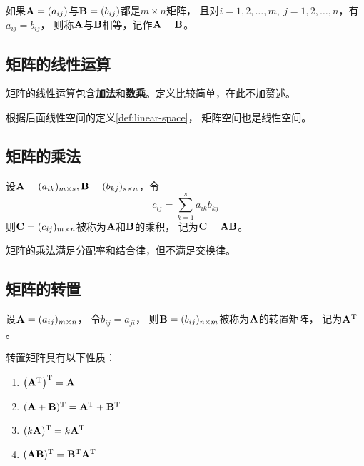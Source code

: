 \begin{definition}[矩阵相等]
  如果$\mathbf{A}=(a_{ij})$与$\mathbf{B}=(b_{ij})$都是$m\times n$矩阵，
  且对$i=1,2,\dots,m,\ j=1,2,\dots,n$，有$a_{ij}=b_{ij}$，
  则称$\mathbf{A}$与$\mathbf{B}$相等，记作$\mathbf{A}=\mathbf{B}$。
\end{definition}

\subsection{矩阵的线性运算}
矩阵的线性运算包含\textbf{加法}和\textbf{数乘}。定义比较简单，在此不加赘述。

根据后面线性空间的定义\ref{def:linear-space}，
矩阵空间也是线性空间。

\subsection{矩阵的乘法}
\begin{definition}[矩阵的乘法]
  设$\mathbf{A}=(a_{ik})_{m\times s}, \mathbf{B}=(b_{kj})_{s\times n}$，令
  \begin{equation}
  c_{ij}=\sum_{k=1}^{s}a_{ik}b_{kj}
  \end{equation}
  则$\mathbf{C}=(c_{ij})_{m\times n}$被称为$\mathbf{A}$和$\mathbf{B}$的乘积，
  记为$\mathbf{C} = \mathbf{A}\mathbf{B}$。
\end{definition}

矩阵的乘法满足分配率和结合律，但不满足交换律。

\subsection{矩阵的转置}
\begin{definition}[矩阵的转置]
  设$\mathbf{A}=(a_{ij})_{m\times n}$，
  令$b_{ij}=a_{ji}$，
  则$\mathbf{B}=(b_{ij})_{n\times m}$被称为$\mathbf{A}$的转置矩阵，
  记为$\mathbf{A}^{\textrm{T}}$。
\end{definition}

\begin{theorem}[转置矩阵的性质]
  转置矩阵具有以下性质：
  \begin{enumerate}
    \item $\left(\mathbf{A}^{\textrm{T}}\right)^{\textrm{T}} = \mathbf{A}$
    \item $(\mathbf{A}+\mathbf{B})^{\textrm{T}}=\mathbf{A}^{\textrm{T}} + \mathbf{B}^{\textrm{T}}$
    \item $(k\mathbf{A})^{\textrm{T}}=k\mathbf{A}^{\textrm{T}}$
    \item $(\mathbf{A}\mathbf{B})^{\textrm{T}}=\mathbf{B}^{\textrm{T}}\mathbf{A}^{\textrm{T}}$
  \end{enumerate}
\end{theorem}

